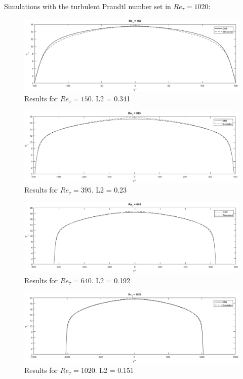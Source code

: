 \documentclass[10pt]{article} %
\begin{document}
Simulations with the turbulent Prandtl number set in $Re_\tau = 1020$:  \\
	\begin{figure}[!h]
		\centering
		\includegraphics[angle=0, scale=0.36]{150segundo}
		\caption{Results for $Re_\tau = 150$. L2 = 0.341}
	\end{figure}
	\begin{figure}[!h]
		\centering
		\includegraphics[angle=0, scale=0.36]{395segundo}
		\caption{Results for $Re_\tau = 395$. L2 = 0.23}
	\end{figure}
	\begin{figure}[!h]
		\centering
		\includegraphics[angle=0, scale=0.36]{640segundo}
		\caption{Results for $Re_\tau = 640$. L2 = 0.192}
	\end{figure}
	\begin{figure}[!h]
		\centering
		\includegraphics[angle=0, scale=0.36]{1020segundo}
		\caption{Results for $Re_\tau = 1020$. L2 = 0.151}
	\end{figure}	
\end{document}
